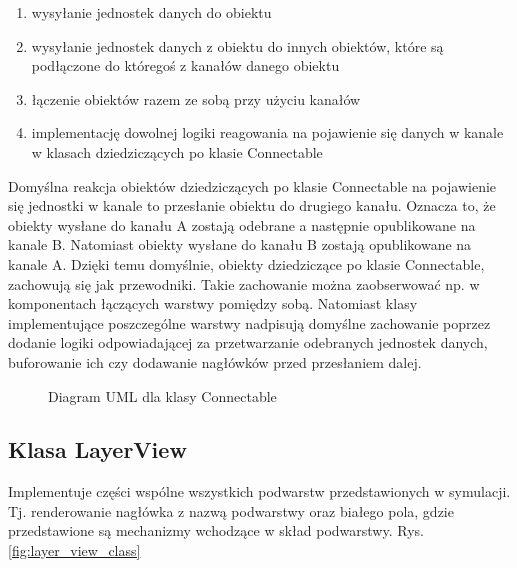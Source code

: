 \begin{enumerate}
	\item wysyłanie jednostek danych do obiektu
	\item wysyłanie jednostek danych z obiektu do innych obiektów, które są podłączone do któregoś z kanałów danego obiektu
	\item łączenie obiektów razem ze sobą przy użyciu kanałów
	\item implementację dowolnej logiki reagowania na pojawienie się danych w kanale w klasach dziedziczących po klasie Connectable
\end{enumerate}

Domyślna reakcja obiektów dziedziczących po klasie Connectable na pojawienie się jednostki w kanale to przesłanie obiektu do drugiego kanału. Oznacza to, że obiekty wysłane do kanału A zostają odebrane a następnie opublikowane na kanale B. Natomiast obiekty wysłane do kanału B zostają opublikowane na kanale A. Dzięki temu domyślnie, obiekty dziedziczące po klasie Connectable, zachowują się jak przewodniki. Takie zachowanie można zaobserwować np. w komponentach łączących warstwy pomiędzy sobą. Natomiast klasy implementujące poszczególne warstwy nadpisują domyślne zachowanie poprzez dodanie logiki odpowiadającej za przetwarzanie odebranych jednostek danych, buforowanie ich czy dodawanie nagłówków przed przesłaniem dalej.

\begin{figure}[ht]
	\centerline{}
	\caption{Diagram UML dla klasy Connectable}
	\label{fig:connectable_class}
\end{figure}

\subsection{Klasa LayerView}

Implementuje części wspólne wszystkich podwarstw przedstawionych w symulacji. Tj. renderowanie nagłówka z nazwą podwarstwy oraz białego pola, gdzie przedstawione są mechanizmy wchodzące w skład podwarstwy. Rys. \ref{fig:layer_view_class}

